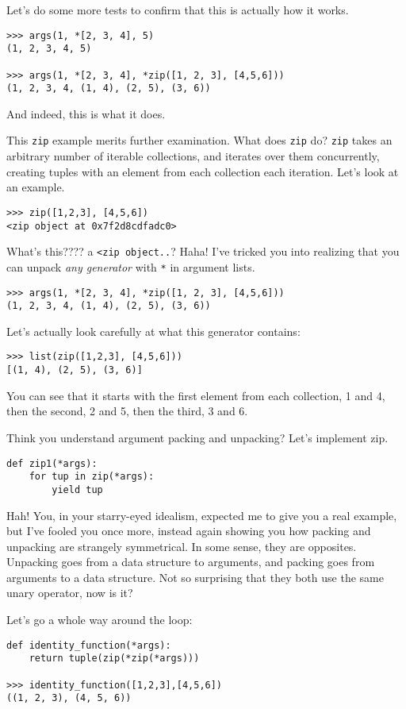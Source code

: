\documentclass[11pt]{article}
\begin{document}
Let's do some more tests to confirm that this is actually how it works.
\begin{verbatim}
>>> args(1, *[2, 3, 4], 5)
(1, 2, 3, 4, 5)

>>> args(1, *[2, 3, 4], *zip([1, 2, 3], [4,5,6]))
(1, 2, 3, 4, (1, 4), (2, 5), (3, 6))
\end{verbatim}
And indeed, this is what it does.

This \texttt{zip} example merits further examination. What does \texttt{zip} do?
\texttt{zip} takes an arbitrary number of iterable collections, and
iterates over them concurrently, creating tuples with an element
from each collection each iteration. Let's look at an example.
\begin{verbatim}
>>> zip([1,2,3], [4,5,6])
<zip object at 0x7f2d8cdfadc0>
\end{verbatim}
What's this???? a \texttt{<zip object..}? Haha! I've tricked you into
realizing that you can unpack \emph{any generator} with \texttt{*} in argument
lists.
\begin{verbatim}
>>> args(1, *[2, 3, 4], *zip([1, 2, 3], [4,5,6]))
(1, 2, 3, 4, (1, 4), (2, 5), (3, 6))
\end{verbatim}

Let's actually look carefully at what this generator contains:
\begin{verbatim}
>>> list(zip([1,2,3], [4,5,6]))
[(1, 4), (2, 5), (3, 6)]
\end{verbatim}
You can see that it starts with the first element from each
collection, 1 and 4, then the second, 2 and 5, then the third, 3 and 6.

Think you understand argument packing and unpacking? Let's implement
zip.
\begin{verbatim}
def zip1(*args):
    for tup in zip(*args):
        yield tup
\end{verbatim}
Hah! You, in your starry-eyed idealism, expected me to give you a real
example, but I've fooled you once more, instead again showing you
how packing and unpacking are strangely symmetrical. In some sense,
they are opposites. Unpacking goes from a data structure to
arguments, and packing goes from arguments to a data structure. Not
so surprising that they both use the same unary operator, now is it?

Let's go a whole way around the loop:
\begin{verbatim}
def identity_function(*args):
    return tuple(zip(*zip(*args)))

>>> identity_function([1,2,3],[4,5,6])
((1, 2, 3), (4, 5, 6))
\end{verbatim}
\end{document}
